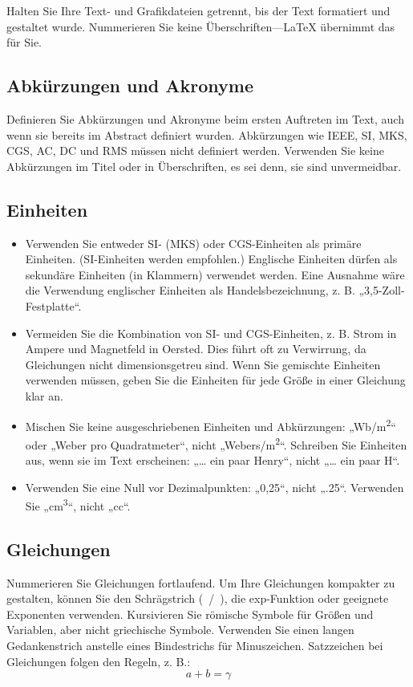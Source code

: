 \documentclass[conference]{IEEEtran}
\begin{document}
Halten Sie Ihre Text- und Grafikdateien getrennt, bis der Text
formatiert und gestaltet wurde. Nummerieren Sie keine Überschriften—{\LaTeX} übernimmt das
für Sie.

\subsection{Abkürzungen und Akronyme}\label{AA}
Definieren Sie Abkürzungen und Akronyme beim ersten Auftreten im Text,
auch wenn sie bereits im Abstract definiert wurden. Abkürzungen wie
IEEE, SI, MKS, CGS, AC, DC und RMS müssen nicht definiert werden. Verwenden Sie keine
Abkürzungen im Titel oder in Überschriften, es sei denn, sie sind unvermeidbar.

\subsection{Einheiten}
\begin{itemize}
\item Verwenden Sie entweder SI- (MKS) oder CGS-Einheiten als primäre Einheiten. (SI-Einheiten werden empfohlen.) Englische Einheiten dürfen als sekundäre Einheiten (in Klammern) verwendet werden. Eine Ausnahme wäre die Verwendung englischer Einheiten als Handelsbezeichnung, z. B. „3,5-Zoll-Festplatte“.
\item Vermeiden Sie die Kombination von SI- und CGS-Einheiten, z. B. Strom in Ampere und Magnetfeld in Oersted. Dies führt oft zu Verwirrung, da Gleichungen nicht dimensionsgetreu sind. Wenn Sie gemischte Einheiten verwenden müssen, geben Sie die Einheiten für jede Größe in einer Gleichung klar an.
\item Mischen Sie keine ausgeschriebenen Einheiten und Abkürzungen: „Wb/m\textsuperscript{2}“ oder „Weber pro Quadratmeter“, nicht „Webers/m\textsuperscript{2}“. Schreiben Sie Einheiten aus, wenn sie im Text erscheinen: „… ein paar Henry“, nicht „… ein paar H“.
\item Verwenden Sie eine Null vor Dezimalpunkten: „0,25“, nicht „.25“. Verwenden Sie „cm\textsuperscript{3}“, nicht „cc“.
\end{itemize}

\subsection{Gleichungen}
Nummerieren Sie Gleichungen fortlaufend. Um Ihre Gleichungen kompakter zu gestalten, können Sie den Schrägstrich (~/~), die exp-Funktion oder
geeignete Exponenten verwenden. Kursivieren Sie römische Symbole für Größen und Variablen,
aber nicht griechische Symbole. Verwenden Sie einen langen Gedankenstrich anstelle eines Bindestrichs für Minuszeichen. Satzzeichen bei Gleichungen folgen den Regeln, z. B.:
\begin{equation}
a+b=\gamma\label{eq}
\end{equation}
\end{document}

